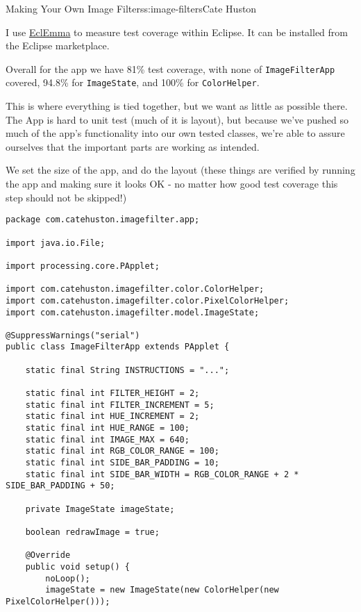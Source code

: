 \begin{aosachapter}{Making Your Own Image Filters}{s:image-filters}{Cate Huston}
\label{measuring-test-coverage}

I use
\href{http://www.eclemma.org/installation.html\#marketplace}{EclEmma} to
measure test coverage within Eclipse. It can be installed from the
Eclipse marketplace.

Overall for the app we have 81\% test coverage, with none of
\texttt{ImageFilterApp} covered, 94.8\% for \texttt{ImageState}, and
100\% for \texttt{ColorHelper}.

\label{imagefilterapp}

This is where everything is tied together, but we want as little as
possible there. The App is hard to unit test (much of it is layout), but
because we've pushed so much of the app's functionality into our own
tested classes, we're able to assure ourselves that the important parts
are working as intended.

We set the size of the app, and do the layout (these things are verified
by running the app and making sure it looks OK - no matter how good test
coverage this step should not be skipped!)

\begin{verbatim}
package com.catehuston.imagefilter.app;

import java.io.File;

import processing.core.PApplet;

import com.catehuston.imagefilter.color.ColorHelper;
import com.catehuston.imagefilter.color.PixelColorHelper;
import com.catehuston.imagefilter.model.ImageState;

@SuppressWarnings("serial")
public class ImageFilterApp extends PApplet {

    static final String INSTRUCTIONS = "...";

    static final int FILTER_HEIGHT = 2;
    static final int FILTER_INCREMENT = 5;
    static final int HUE_INCREMENT = 2;
    static final int HUE_RANGE = 100;
    static final int IMAGE_MAX = 640;
    static final int RGB_COLOR_RANGE = 100;
    static final int SIDE_BAR_PADDING = 10;
    static final int SIDE_BAR_WIDTH = RGB_COLOR_RANGE + 2 * SIDE_BAR_PADDING + 50;

    private ImageState imageState;

    boolean redrawImage = true;

    @Override
    public void setup() {
        noLoop();
        imageState = new ImageState(new ColorHelper(new PixelColorHelper()));


\end{verbatim}
\end{aosachapter}
